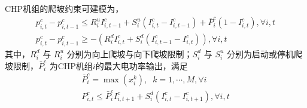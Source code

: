 CHP机组的爬坡约束可建模为\cite{UC-Model-06, CHP-Model-CXY-15, IES-Model-CXY-18}，
\begin{subequations}
\begin{gather}
p_{i,t}^c - p_{i,t - 1}^c \le R_i^uI_{i,t - 1}^c + S_i^u(I_{i,t}^c - I_{i,t - 1}^c) + \bar P_i^c(1 - I_{i,t}^c), \forall i,t \\
p_{i,t}^c - p_{i,t - 1}^c \ge  - (R_i^dI_{i,t}^c + S_i^d(I_{i,t - 1}^c - I_{i,t}^c)), \forall i,t
\end{gather}
\end{subequations}
其中，$R_i^d$ 与 $R_i^u$ 分别为向上爬坡与向下爬坡限制；$S_i^d$ 与 $S_i^u$ 分别为启动或停机爬坡限制，$\bar P_i^c$  为CHP机组$i$的最大电功率输出，满足
\cite{IES-Model-CXY-18}
\begin{subequations}
\begin{gather}
\bar P_i^c = \max (x_i^k),\;\;k = 1,\cdots,M, \forall i\\
P_{i,t}^c \le \bar P_i^cI_{i,t + 1}^c + S_i^d(I_{i,t}^c - I_{i,t + 1}^c), \forall i,t
\end{gather}
\end{subequations}

